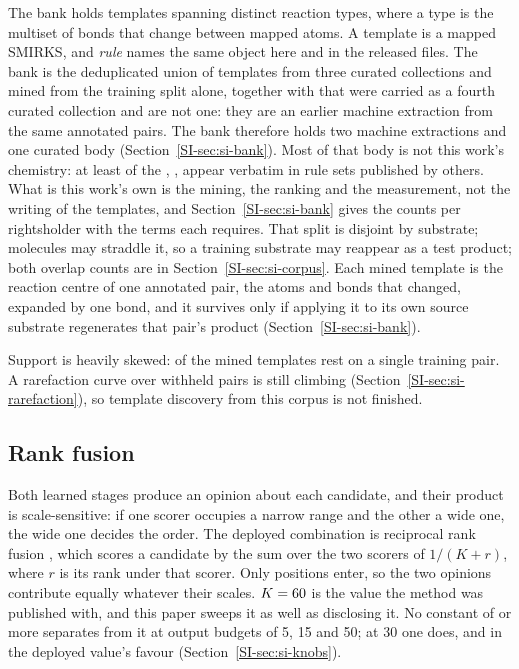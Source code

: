 The bank holds \numBankRules{} templates spanning \numBankTypes{} distinct reaction types, where a
type is the multiset of bonds that change between mapped atoms. A template is a mapped SMIRKS,
and \emph{rule} names the same object here and in the released files. The bank is the
deduplicated union of \numAttribNamed{} templates
from three curated collections and \numMinedRules{} mined from the training split alone,
together with \numAttribUnattributed{} that were carried as a fourth curated collection and are
not one: they are an earlier machine extraction from the same annotated pairs. The bank therefore holds two machine extractions and one curated body (Section~\ref{SI-sec:si-bank}). Most of that body is not this work's chemistry: at least \numThirdpartyBorrowed{} of the \numAttribNamed{}, \numThirdpartyBorrowedsharePct{}, appear verbatim in rule sets published by others. What is this work's own is the mining, the ranking and
the measurement, not the writing of the templates, and Section~\ref{SI-sec:si-bank} gives the
counts per rightsholder with the terms each requires. That split is disjoint by substrate; molecules may straddle it, so a training substrate may reappear as a test product; both overlap counts are in Section~\ref{SI-sec:si-corpus}. Each mined template is the reaction centre of one annotated pair, the atoms and bonds that changed, expanded by one bond, and it survives only if applying it to its own source substrate regenerates that pair's product (Section~\ref{SI-sec:si-bank}).

Support is heavily skewed: \numRareSingletonsharePct{} of the mined templates rest on a single
training pair. A rarefaction curve over withheld pairs is still climbing (Section~\ref{SI-sec:si-rarefaction}), so template discovery from this corpus is not finished.

\subsection{Rank fusion}

Both learned stages produce an opinion about each candidate, and their product is scale-sensitive:
if one scorer occupies a narrow range and the other a wide one, the wide one decides the order. The deployed combination is reciprocal rank fusion \citep{cormack2009}, which scores a candidate by the sum over the two scorers of $1/(K + r)$, where $r$ is its rank under that scorer. Only positions enter, so the two opinions
contribute equally whatever their scales. $K = 60$ is the value the method was
published with, and this paper sweeps it as well as disclosing it. No constant of \numFusionkFlatfrom{} or more separates from it at output budgets of 5, 15 and 50; at 30 one does, and in the deployed value's favour (Section~\ref{SI-sec:si-knobs}).


